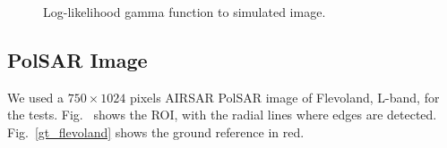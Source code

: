 \documentclass[journal]{IEEEtran}
\begin{document}
   \begin{figure}[hbt]
   \centering
    \caption{Log-likelihood gamma function to simulated image.} \label{fig:loglikelihood_im_sim_gamma}   
\end{figure}

\subsection{PolSAR Image}

We used a $750\times 1024$ pixels AIRSAR PolSAR image of Flevoland, L-band, for the tests. 
Fig.~ shows the ROI, with the radial lines where edges are detected. 
Fig.~\ref{gt_flevoland} shows the ground reference in red.  
\end{document}
